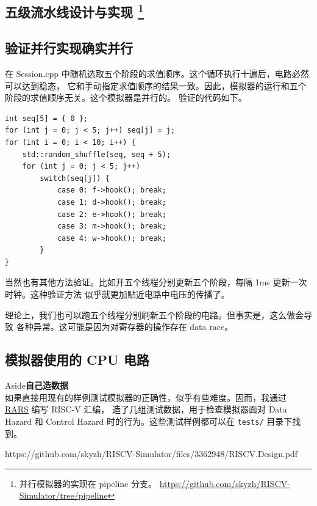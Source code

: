 \documentclass[12pt]{article}
\newenvironment{aside}[1]
    { \begin{tcolorbox}[enlarge top by=0.5cm, enlarge bottom by=0.5cm] Aside\space\space\space\space \textbf{#1} \\
        } { \end{tcolorbox} }
\begin{document}
    \subsection{五级流水线设计与实现\protect
        \footnote{并行模拟器的实现在 pipeline 分支。
        \url{https://github.com/skyzh/RISCV-Simulator/tree/pipeline}}}

    \subsection{验证并行实现确实并行}

    在 Session.cpp 中随机选取五个阶段的求值顺序。这个循环执行十遍后，电路必然可以达到稳态，
    它和手动指定求值顺序的结果一致。因此，模拟器的运行和五个阶段的求值顺序无关。这个模拟器是并行的。
    验证的代码如下。

    \begin{verbatim}
int seq[5] = { 0 };
for (int j = 0; j < 5; j++) seq[j] = j;
for (int i = 0; i < 10; i++) {
    std::random_shuffle(seq, seq + 5);
    for (int j = 0; j < 5; j++)
        switch(seq[j]) {
            case 0: f->hook(); break;
            case 1: d->hook(); break;
            case 2: e->hook(); break;
            case 3: m->hook(); break;
            case 4: w->hook(); break;
        }
}
    \end{verbatim}

    当然也有其他方法验证。比如开五个线程分别更新五个阶段，每隔 1ms 更新一次时钟。这种验证方法
    似乎就更加贴近电路中电压的传播了。

    \begin{tcolorbox}
        理论上，我们也可以跑五个线程分别刷新五个阶段的电路。但事实是，这么做会导致
        各种异常。这可能是因为对寄存器的操作存在 data race。
    \end{tcolorbox}

    \subsection{模拟器使用的 CPU 电路}

    \begin{aside}{自己造数据}
        如果直接用现有的样例测试模拟器的正确性，似乎有些难度。因而，我通过 
        \href{https://github.com/TheThirdOne/rars}{RARS} 编写 RISC-V 汇编，
        造了几组测试数据，用于检查模拟器面对 Data Hazard 和
        Control Hazard 时的行为。这些测试样例都可以在 \texttt{tests/} 目录下找到。
    \end{aside}

    https://github.com/skyzh/RISCV-Simulator/files/3362948/RISCV.Design.pdf
    
\end{document}
